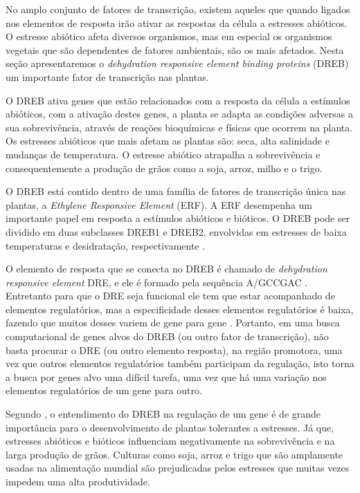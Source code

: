 No amplo conjunto de fatores de transcrição, existem aqueles que quando ligados nos elementos de resposta irão ativar as respostas da célula a estresses abióticos. O estresse abiótico afeta diversos organismos, mas em especial os organismos vegetais que são dependentes de fatores ambientais, são os mais afetados. Nesta seção apresentaremos o \textit{dehydration responsive element binding proteins} (DREB) um importante fator de transcrição nas plantas.

O DREB ativa genes que estão relacionados com a resposta da célula a estímulos abióticos, com a ativação destes genes, a planta se adapta as condições adversas a sua sobrevivência, através de reações bioquímicas e físicas que ocorrem na planta. Os estresses abióticos que mais afetam as plantas são: seca, alta salinidade e mudanças de temperatura. O estresse abiótico atrapalha a sobrevivência e consequentemente a produção de grãos como a soja, arroz, milho e o trigo.

O DREB está contido dentro de uma família de fatores de transcrição única nas plantas, a \textit{Ethylene Responsive Element} (ERF). A ERF desempenha um importante papel em resposta a estímulos abióticos e bióticos. O DREB pode ser dividido em duas subclasses DREB1 e DREB2, envolvidas em estresses de baixa temperaturas e desidratação, respectivamente \cite{Chen2007GmDREB2}.

O elemento de resposta que se conecta no DREB é chamado de \textit{dehydration responsive element} DRE, e ele é formado pela sequência A/GCCGAC \cite{Nakashima2009}. Entretanto para que o DRE seja funcional ele tem que estar acompanhado de elementos regulatórios, mas a especificidade desses elementos regulatórios é baixa, fazendo que muitos desses variem de gene para gene \cite{Zhang2005}. Portanto, em uma busca computacional de genes alvos do DREB (ou outro fator de transcrição), não basta procurar o DRE (ou outro elemento resposta), na região promotora, uma vez que outros elementos regulatórios também participam da regulação, isto torna a busca por genes alvo uma difícil tarefa, uma vez que há uma variação nos elementos regulatórios de um gene para outro.

Segundo \cite{Agarwal2006}, o entendimento do DREB na regulação de um gene é de grande importância para o desenvolvimento de plantas tolerantes a estresses. Já que, estresses abióticos e bióticos influenciam negativamente na sobrevivência e na larga produção de grãos. Culturas como soja, arroz e trigo que são amplamente usadas na alimentação mundial são prejudicadas pelos estresses que muitas vezes impedem uma alta produtividade. 
